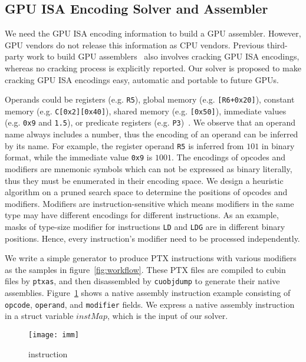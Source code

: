 \subsection{GPU ISA Encoding Solver and Assembler}
We need the GPU ISA encoding information to build a GPU assembler.
However, GPU vendors do not release this information as CPU vendors.
Previous third-party work to build GPU assemblers~\cite{decuda,asfermi,maxas} also
involves cracking GPU ISA encodings, whereas no cracking process is explicitly reported.
Our solver is proposed to make cracking GPU ISA encodings easy, automatic and portable to future GPUs.


Operands could be registers (e.g. {\tt R5}), 
global memory (e.g. {\tt [R6+0x20]}), constant memory (e.g. {\tt C[0x2][0x40]}), shared memory (e.g. {\tt [0x50]}), immediate values (e.g. {\tt 0x9} and {\tt1.5}), or predicate registers (e.g. {\tt P3})~\cite{ptx2015isa}.
We observe that an operand name always includes a number, thus the encoding of an operand can be inferred by its name.
For example, the register operand {\tt R5} is inferred from $101$ in binary format, while the immediate value {\tt 0x9} is $1001$. 
The encodings of opcodes and modifiers are mnemonic symbols which can not be expressed as binary literally, thus they must be enumerated in their encoding space.
We design a heuristic algorithm on a pruned search space to determine the positions of opcodes and modifiers.
Modifiers are instruction-sensitive which means modifiers in the same type may have different encodings for different instructions. 
As an example, masks of type-size modifier for instructions {\tt LD} and {\tt LDG} are in different binary positions. 
Hence, every instruction's modifier need to be processed independently. 

We write a simple generator to produce PTX instructions with various modifiers as the samples in figure~\ref{fig:workflow}.
These PTX files are compiled to cubin files by {\tt ptxas}, and then disassembled by {\tt cuobjdump} to generate their native assemblies. 
Figure~\ref{fig:imm} shows a native assembly instruction example consisting of {\tt opcode}, {\tt operand}, and {\tt modifier} fields.
We express a native assembly instruction in a struct variable $instMap$, which is the input of our solver.
\begin{figure}[htbp]
\begin{center}
\texttt{[image: imm]}
    \caption{ instruction}
\label{fig:imm}
\end{center}
\end{figure}

